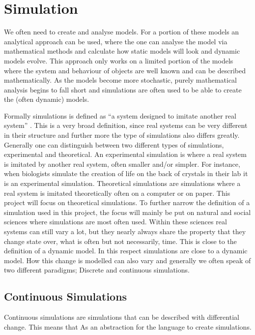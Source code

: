 \section{Simulation}
We often need to create and analyse models. %
 For a portion of these models an analytical approach can be used, where the one can analyse the model via mathematical methods and calculate how static models will look and dynamic models evolve. This approach only works on a limited portion of the models where the system and behaviour of objects are well known and can be described mathematically. As the models become more stochastic, purely mathematical analysis begins to fall short and simulations are often used to be able to create the (often dynamic) models.

Formally simulations is defined as \enquote{a system designed to imitate another real system} . This is a very broad definition, since real systems can be very different in their structure and further more the type of simulations also differs greatly. Generally one can distinguish between two different types of simulations, experimental and theoretical. An experimental simulation is where a real system is imitated by another real system, often smaller and/or simpler. For instance, when biologists simulate the creation of life on the back of crystals in their lab it is an experimental simulation. Theoretical simulations are simulations where a real system is imitated theoretically often on a computer or on paper. This project will focus on theoretical simulations. To further narrow the definition of a simulation used in this project, the focus will mainly be put on natural and social sciences where simulations are most often used. Within these sciences real systems can still vary a lot, but they nearly always share the property that they change state over, what is often but not necessarily, time. This is close to the definition of a dynamic model. In this respect simulations are close to a dynamic model. How this change is modelled can also vary and generally we often speak of two different paradigms; Discrete and continuous simulations.


\subsection{Continuous Simulations}
Continuous simulations are simulations that can be described with differential change. This means that
\label{simulationchoise}
As an abstraction for the language to create simulations.


